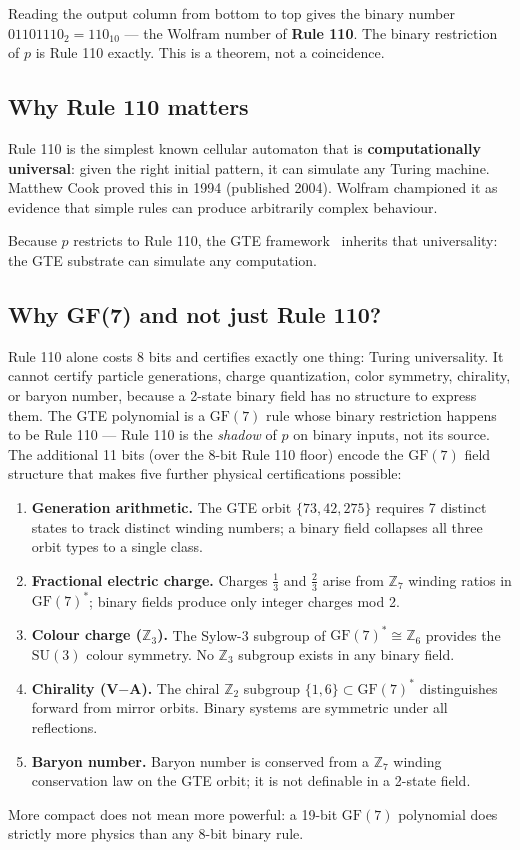 \documentclass[11pt,a4paper]{article}
\newcommand{\term}[1]{\textbf{#1}}
\begin{document}
Reading the output column from bottom to top gives the binary number
$01101110_2 = 110_{10}$ — the Wolfram number of \textbf{Rule 110}.  The
binary restriction of $p$ is Rule 110 exactly.  This is a theorem, not a
coincidence.

\subsection{Why Rule 110 matters}

Rule 110 is the simplest known cellular automaton that is
\term{computationally universal}: given the right initial pattern, it can
simulate any Turing machine.  Matthew Cook proved this in 1994 (published
2004).  Wolfram championed it as evidence that simple rules can produce
arbitrarily complex behaviour.

Because $p$ restricts to Rule 110, the GTE framework~\cite{SpivackGTECompleteFramework} inherits that
universality: the GTE substrate can simulate any computation.

\subsection{Why GF(7) and not just Rule 110?}

Rule 110 alone costs 8 bits and certifies exactly one thing: Turing universality.
It cannot certify particle generations, charge quantization, color symmetry,
chirality, or baryon number, because a 2-state binary field has no structure to
express them.
The GTE polynomial is a $\mathrm{GF}(7)$ rule whose binary restriction happens to
be Rule 110 --- Rule 110 is the \emph{shadow} of $p$ on binary inputs, not its
source.
The additional 11 bits (over the 8-bit Rule 110 floor) encode the $\mathrm{GF}(7)$
field structure that makes five further physical certifications possible:
\begin{enumerate}
  \item \textbf{Generation arithmetic.} The GTE orbit $\{73, 42, 275\}$ requires
    7 distinct states to track distinct winding numbers; a binary field collapses
    all three orbit types to a single class.
  \item \textbf{Fractional electric charge.} Charges $\tfrac{1}{3}$ and
    $\tfrac{2}{3}$ arise from $\mathbb{Z}_7$ winding ratios in
    $\mathrm{GF}(7)^*$; binary fields produce only integer charges mod 2.
  \item \textbf{Colour charge ($\mathbb{Z}_3$).} The Sylow-3 subgroup of
    $\mathrm{GF}(7)^* \cong \mathbb{Z}_6$ provides the $\mathrm{SU}(3)$ colour
    symmetry.  No $\mathbb{Z}_3$ subgroup exists in any binary field.
  \item \textbf{Chirality (V$-$A).} The chiral $\mathbb{Z}_2$ subgroup
    $\{1, 6\} \subset \mathrm{GF}(7)^*$ distinguishes forward from mirror orbits.
    Binary systems are symmetric under all reflections.
  \item \textbf{Baryon number.} Baryon number is conserved from a $\mathbb{Z}_7$
    winding conservation law on the GTE orbit; it is not definable in a 2-state
    field.
\end{enumerate}
More compact does not mean more powerful: a 19-bit $\mathrm{GF}(7)$ polynomial
does strictly more physics than any 8-bit binary rule.
\end{document}
